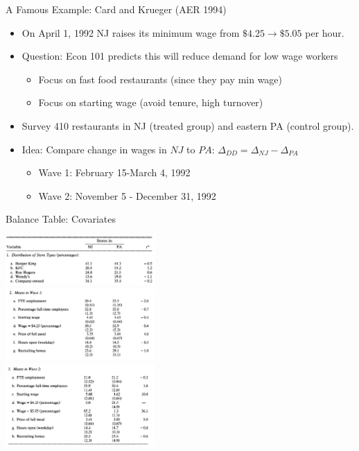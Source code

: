 \documentclass[xcolor=pdftex,dvipsnames,table,mathserif,aspectratio=169]{beamer}
\begin{document}
\begin{frame}{A Famous Example: Card and Krueger (AER 1994)}
\begin{itemize}
\item On April 1, 1992 NJ raises its minimum wage from $\$4.25\rightarrow \$5.05$ per hour.
\item Question: Econ 101 predicts this will \alert{reduce demand for low wage workers}
\begin{itemize}
\item Focus on fast food restaurants (since they pay min wage)
\item Focus on starting wage (avoid tenure, high turnover)
\end{itemize}
\item Survey 410 restaurants in NJ (treated group) and eastern PA (control group).
\item Idea: Compare \alert{change} in wages in $NJ$ to $PA$:  $\Delta_{DD} = \Delta_{NJ}- \Delta_{PA}$
\begin{itemize}
\item Wave 1: February 15-March 4, 1992
\item Wave 2: November 5 - December 31, 1992
\end{itemize}
\end{itemize}
\end{frame}

\begin{frame}{Balance Table: Covariates}
\begin{center}
\includegraphics[width=2.25in]{./resources/ck_tab2b.png}\\
\includegraphics[width=2.25in]{./resources/ck_tab2c.png}\\
\includegraphics[width=2.25in]{./resources/ck_tab2a.png}
\end{center}
\end{frame}
\end{document}
